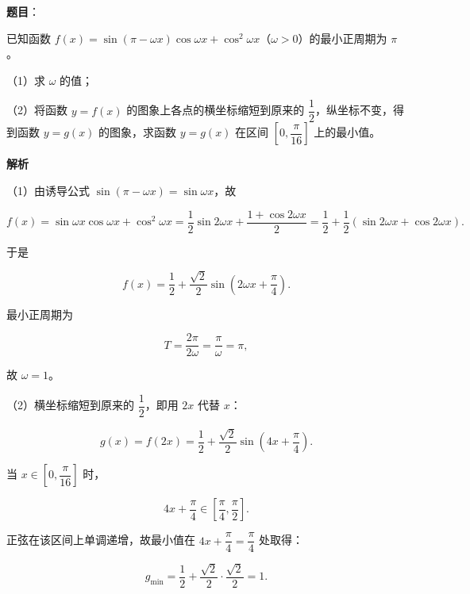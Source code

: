\begin{answer}

\textbf{题目}：

已知函数 $f(x)=\sin(\pi-\omega x)\cos\omega x+\cos^2\omega x$（$\omega>0$）的最小正周期为 $\pi$。

（1）求 $\omega$ 的值；

（2）将函数 $y=f(x)$ 的图象上各点的横坐标缩短到原来的 $\dfrac12$，纵坐标不变，得到函数 $y=g(x)$ 的图象，求函数 $y=g(x)$ 在区间 $\left[0,\dfrac\pi{16}\right]$ 上的最小值。

\textbf{解析}

（1）由诱导公式 $\sin(\pi-\omega x)=\sin\omega x$，故

\nopagebreak[4]
\[f(x)=\sin\omega x\cos\omega x+\cos^2\omega x
=\frac12\sin2\omega x+\frac{1+\cos2\omega x}{2}
=\frac12+\frac12(\sin2\omega x+\cos2\omega x).\]

于是

\nopagebreak[4]
\[f(x)=\frac12+\frac{\sqrt2}2\sin\left(2\omega x+\frac\pi4\right).\]

最小正周期为

\nopagebreak[4]
\[T=\frac{2\pi}{2\omega}=\frac\pi\omega=\pi,\]

故 $\omega=1$。

（2）横坐标缩短到原来的 $\dfrac12$，即用 $2x$ 代替 $x$：

\nopagebreak[4]
\[g(x)=f(2x)=\frac12+\frac{\sqrt2}2\sin\left(4x+\frac\pi4\right).\]

当 $x\in\left[0,\dfrac\pi{16}\right]$ 时，

\nopagebreak[4]
\[4x+\frac\pi4\in\left[\frac\pi4,\frac\pi2\right].\]

正弦在该区间上单调递增，故最小值在 $4x+\dfrac\pi4=\dfrac\pi4$ 处取得：

\nopagebreak[4]
\[g_{\min}=\frac12+\frac{\sqrt2}2\cdot\frac{\sqrt2}2=1.\]


\end{answer}
